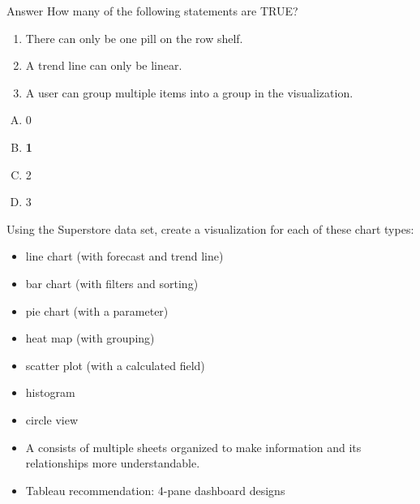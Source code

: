 \documentclass[xcolor=svgnames]{beamer} %
\begin{document}
\begin{frame}
\begin{block}{Answer}
How many of the following statements are TRUE?
\begin{enumerate}
\item There can only be one pill on the row shelf. \pxmark
\item A trend line can only be linear.\pxmark
\item A user can group multiple items into a group in the visualization. \pcmark
\end{enumerate}
\begin{multicols}{5}
\begin{enumerate}[A)]
\item 0 
\item {\bf 1}
\item 2
\item 3
\end{enumerate}
\end{multicols}

\end{block}
\end{frame}



\begin{frame}
Using the Superstore data set, create a visualization for each of these chart types:

\begin{itemize}
\item line chart (with forecast and trend line)
\item bar chart (with filters and sorting)
\item pie chart (with a parameter)
\item heat map (with grouping)
\item scatter plot (with a calculated field)
\item histogram
\item circle view
\end{itemize}
\end{frame}

\begin{frame}

\begin{itemize}
\item A  consists of multiple sheets organized to make information and its relationships more understandable.\vfill
\item Tableau recommendation: 4-pane dashboard designs

\end{itemize}
\end{frame}
\end{document}
